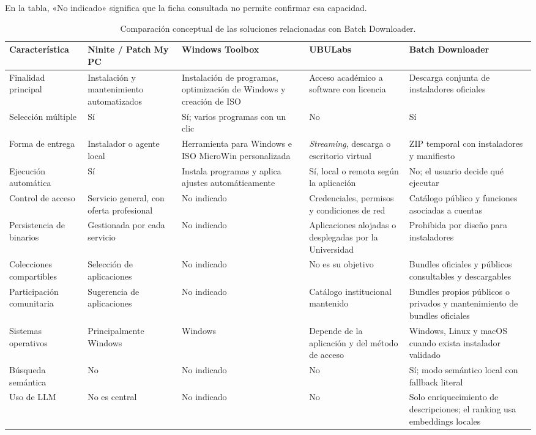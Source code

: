 En la tabla, «No indicado» significa que la ficha consultada no permite confirmar esa capacidad.

\begin{table}[H]
\centering
\scriptsize
\begin{tabularx}{\textwidth}{p{}XXXX}
\toprule
\textbf{Característica} & \textbf{Ninite / Patch My PC} & \textbf{Windows Toolbox~\cite{windows-toolbox}} & \textbf{UBULabs} & \textbf{Batch Downloader}\\
\midrule
Finalidad principal & Instalación y mantenimiento automatizados & Instalación de programas, optimización de Windows y creación de ISO & Acceso académico a software con licencia & Descarga conjunta de instaladores oficiales\\
Selección múltiple & Sí & Sí; varios programas con un clic & No & Sí\\
Forma de entrega & Instalador o agente local & Herramienta para Windows e ISO MicroWin personalizada & \emph{Streaming}, descarga o escritorio virtual & ZIP temporal con instaladores y manifiesto\\
Ejecución automática & Sí & Instala programas y aplica ajustes automáticamente & Sí, local o remota según la aplicación & No; el usuario decide qué ejecutar\\
Control de acceso & Servicio general, con oferta profesional & No indicado & Credenciales, permisos y condiciones de red & Catálogo público y funciones asociadas a cuentas\\
Persistencia de binarios & Gestionada por cada servicio & No indicado & Aplicaciones alojadas o desplegadas por la Universidad & Prohibida por diseño para instaladores\\
Colecciones compartibles & Selección de aplicaciones & No indicado & No es su objetivo & Bundles oficiales y públicos consultables y descargables\\
Participación comunitaria & Sugerencia de aplicaciones & No indicado & Catálogo institucional mantenido & Bundles propios públicos o privados y mantenimiento de bundles oficiales\\
Sistemas operativos & Principalmente Windows & Windows & Depende de la aplicación y del método de acceso & Windows, Linux y macOS cuando exista instalador validado\\
Búsqueda semántica & No & No indicado & No & Sí; modo semántico local con fallback literal\\
Uso de LLM & No es central & No indicado & No & Solo enriquecimiento de descripciones; el ranking usa embeddings locales\\
\bottomrule
\end{tabularx}
\caption{Comparación conceptual de las soluciones relacionadas con Batch Downloader.}
\label{tabla:comparacion-trabajos-relacionados}
\end{table}

